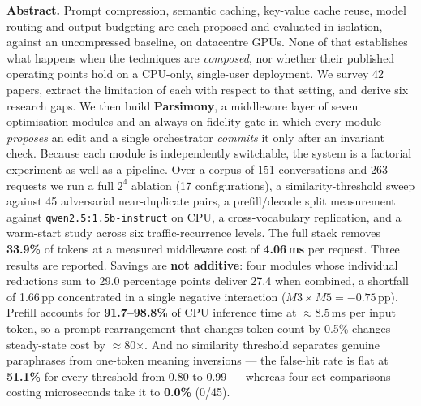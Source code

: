\documentclass[11pt,a4paper]{article}
\begin{document}
\begin{tcolorbox}[colback=white,colframe=ink,boxrule=0.6pt,arc=2pt,
                  left=10pt,right=10pt,top=8pt,bottom=8pt]
\noindent\textbf{Abstract.}
Prompt compression, semantic caching, key-value cache reuse, model routing and
output budgeting are each proposed and evaluated in isolation, against an
uncompressed baseline, on datacentre GPUs. None of that establishes what happens
when the techniques are \emph{composed}, nor whether their published operating
points hold on a CPU-only, single-user deployment. We survey 42 papers, extract
the limitation of each with respect to that setting, and derive six research
gaps. We then build \textbf{Parsimony}, a middleware layer of seven optimisation
modules and an always-on fidelity gate in which every module \emph{proposes} an
edit and a single orchestrator \emph{commits} it only after an invariant check.
Because each module is independently switchable, the system is a factorial
experiment as well as a pipeline. Over a corpus of 151 conversations and 263
requests we run a full $2^4$ ablation (17 configurations), a similarity-threshold
sweep against 45 adversarial near-duplicate pairs, a prefill/decode split
measurement against \texttt{qwen2.5:1.5b-instruct} on CPU, a cross-vocabulary
replication, and a warm-start study across six traffic-recurrence levels. The
full stack removes \textbf{33.9\%} of tokens at a measured middleware cost of
\textbf{4.06\,ms} per request. Three results are reported. Savings are
\textbf{not additive}: four modules whose individual reductions sum to 29.0
percentage points deliver 27.4 when combined, a shortfall of 1.66\,pp
concentrated in a single negative interaction ($M3\times M5 = -0.75$\,pp).
Prefill accounts for \textbf{91.7--98.8\%} of CPU inference time at
$\approx$8.5\,ms per input token, so a prompt rearrangement that changes token
count by 0.5\% changes steady-state cost by $\approx$80$\times$. And no
similarity threshold separates genuine paraphrases from one-token meaning
inversions --- the false-hit rate is flat at \textbf{51.1\%} for every threshold
from 0.80 to 0.99 --- whereas four set comparisons costing microseconds take it
to \textbf{0.0\%} (0/45).


\end{tcolorbox}
\end{document}
